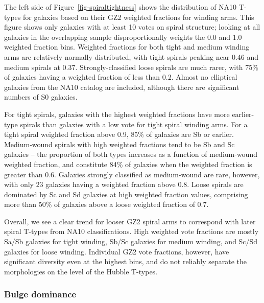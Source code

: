 \documentclass[useAMS,usenatbib]{mn2e}
\begin{document}
The left side of Figure~\ref{fig-spiraltightness} shows the distribution of NA10 T-types for galaxies based on their GZ2 weighted fractions for winding arms. This figure shows only galaxies with at least 10 votes on spiral structure; looking at all galaxies in the overlapping sample disproportionally weights the 0.0 and 1.0 weighted fraction bins. Weighted fractions for both tight and medium winding arms are relatively normally distributed, with tight spirals peaking near 0.46 and medium spirals at 0.37. Strongly-classified loose spirals are much rarer, with 75\% of galaxies having a weighted fraction of less than 0.2. Almost no elliptical galaxies from the NA10 catalog are included, although there are significant numbers of S0 galaxies. 

For tight spirals, galaxies with the highest weighted fractions have more earlier-type spirals than galaxies with a low vote for tight spiral winding arms. For a tight spiral weighted fraction above 0.9, 85\% of galaxies are Sb or earlier. Medium-wound spirals with high weighted fractions tend to be Sb and Sc galaxies -- the proportion of both types increases as a function of medium-wound weighted fraction, and constitute 84\% of galaxies when the weighted fraction is greater than 0.6. Galaxies strongly classified as medium-wound are rare, however, with only 23 galaxies having a weighted fraction above 0.8.  Loose spirals are dominated by Sc and Sd galaxies at high weighted fraction values, comprising more than 50\% of galaxies above a loose weighted fraction of 0.7. 

Overall, we see a clear trend for looser GZ2 spiral arms to correspond with later spiral T-types from NA10 classifications. High weighted vote fractions are mostly Sa/Sb galaxies for tight winding, Sb/Sc galaxies for medium winding, and Sc/Sd galaxies for loose winding. Individual GZ2 vote fractions, however, have significant diversity even at the highest bins, and do not reliably separate the morphologies on the level of the Hubble T-types. 


\subsubsection{Bulge dominance}
\end{document}

